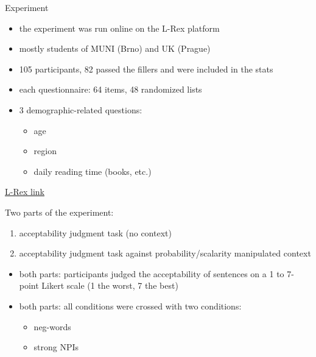 \documentclass[
  ignorenonframetext,
]{beamer}
\providecommand{\tightlist}{%
  \setlength{\itemsep}{0pt}\setlength{\parskip}{0pt}}\usepackage{longtable,booktabs,array}
\begin{document}
\begin{frame}{Experiment}
\protect\hypertarget{experiment}{}
\begin{itemize}
\tightlist
\item
  the experiment was run online on the L-Rex platform
\item
  mostly students of MUNI (Brno) and UK (Prague)
\item
  105 participants, 82 passed the fillers and were included in the stats
\item
  each questionnaire: 64 items, 48 randomized lists
\item
  3 demographic-related questions:

  \begin{itemize}
  \tightlist
  \item
    age
  \item
    region
  \item
    daily reading time (books, etc.)
  \end{itemize}
\end{itemize}

\href{https://www.l-rex.de/studies/exp_april_2022_copy/trials/intro/?test=True}{L-Rex
link}
\end{frame}

\begin{frame}
Two parts of the experiment:

\begin{enumerate}
\item
  acceptability judgment task (no context)
\item
  acceptability judgment task against probability/scalarity manipulated
  context
\end{enumerate}

\begin{itemize}
\item
  both parts: participants judged the acceptability of sentences on a 1
  to 7-point Likert scale (1 the worst, 7 the best)
\item
  both parts: all conditions were crossed with two conditions:

  \begin{itemize}
  \tightlist
  \item
    neg-words
  \item
    strong NPIs
  \end{itemize}
\end{itemize}
\end{frame}
\end{document}
